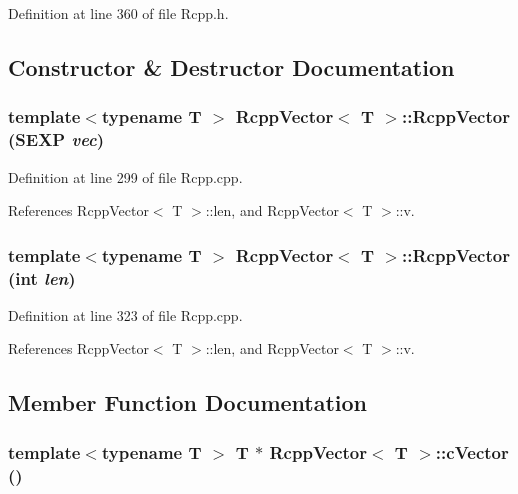 Definition at line 360 of file Rcpp.h.

\subsection{Constructor \& Destructor Documentation}
\hypertarget{classRcppVector_a0925b350f636a546e58ad0329786500a}{
\subsubsection[{RcppVector}]{\setlength{\rightskip}{0pt plus 5cm}template$<$typename T $>$ {\bf RcppVector}$<$ T $>$::{\bf RcppVector} (SEXP {\em vec})}}
\label{classRcppVector_a0925b350f636a546e58ad0329786500a}


Definition at line 299 of file Rcpp.cpp.

References RcppVector$<$ T $>$::len, and RcppVector$<$ T $>$::v.\hypertarget{classRcppVector_aeb7797ca2b2ac2d03fee0a543993f17b}{
\subsubsection[{RcppVector}]{\setlength{\rightskip}{0pt plus 5cm}template$<$typename T $>$ {\bf RcppVector}$<$ T $>$::{\bf RcppVector} (int {\em len})}}
\label{classRcppVector_aeb7797ca2b2ac2d03fee0a543993f17b}


Definition at line 323 of file Rcpp.cpp.

References RcppVector$<$ T $>$::len, and RcppVector$<$ T $>$::v.

\subsection{Member Function Documentation}
\hypertarget{classRcppVector_af4660a27a888a51693b02d2f51b47b08}{
\subsubsection[{cVector}]{\setlength{\rightskip}{0pt plus 5cm}template$<$typename T $>$ T $\ast$ {\bf RcppVector}$<$ T $>$::cVector ()}}
\label{classRcppVector_af4660a27a888a51693b02d2f51b47b08}


